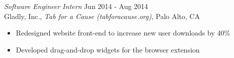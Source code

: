 {\sl Software Engineer Intern} \hfill Jun 2014 - Aug 2014 \\
Gladly, Inc., \textit{Tab for a Cause (tabforacause.org)}, Palo Alto, CA
\begin{itemize} \itemsep -2pt %
\item Redesigned website front-end to increase new user downloads by 40\%
\item Developed drag-and-drop widgets for the browser extension
\end{itemize}
